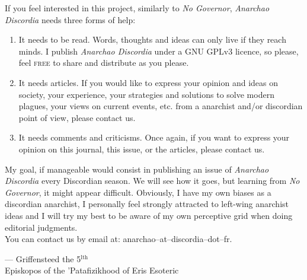 \documentclass[12pt, onecolumn, letterpaper, oneside]{book}
\begin{document}
If you feel interested in this project, similarly to \emph{No Governor}, \emph{Anarchao Discordia} needs three forms of help:
\begin{enumerate}
\item It needs to be read. Words, thoughts and ideas can only live if they reach minds. I publish \emph{Anarchao Discordia} under a GNU GPLv3 licence, so please, feel \textsc{free} to share and distribute as you please.
\item It needs articles. If you would like to express your opinion and ideas on society, your experience, your strategies and solutions to solve modern plagues, your views on current events, etc. from a anarchist and/or discordian point of view, please contact us.
\item It needs comments and criticisms. Once again, if you want to express your opinion on this journal, this issue, or the articles, please contact us.
\end{enumerate}

My goal, if manageable would consist in publishing an issue of \emph{Anarchao Discordia} every Discordian season. We will see how it goes, but learning from \emph{No Governor}, it might appear difficult. Obviously, I have my own biases as a discordian anarchist, I personally feel strongly attracted to left-wing anarchist ideas and I will try my best to be aware of my own perceptive grid when doing editorial judgments.\\

You can contact us by email at: anarchao--at--discordia--dot--fr.

\par\begin{flushright} --- Griffensteed the 5$^\text{lth}$\\ Episkopos of the 'Patafizikhood of Eris Esoteric\end{flushright}










\end{document}
